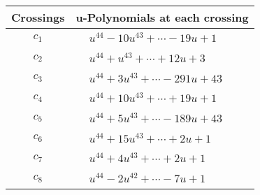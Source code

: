 \documentclass[1p]{elsarticle_modified}
\theoremstyle{definition}
\begin{document}
\begin{tabular}{m{50pt}|m{274pt}}
Crossings & \hspace{64pt}u-Polynomials at each crossing \\
\hline $$\begin{aligned}c_{1}\end{aligned}$$&$\begin{aligned}
&u^{44}-10 u^{43}+\cdots-19 u+1
\end{aligned}$\\
\hline $$\begin{aligned}c_{2}\end{aligned}$$&$\begin{aligned}
&u^{44}+u^{43}+\cdots+12 u+3
\end{aligned}$\\
\hline $$\begin{aligned}c_{3}\end{aligned}$$&$\begin{aligned}
&u^{44}+3 u^{43}+\cdots-291 u+43
\end{aligned}$\\
\hline $$\begin{aligned}c_{4}\end{aligned}$$&$\begin{aligned}
&u^{44}+10 u^{43}+\cdots+19 u+1
\end{aligned}$\\
\hline $$\begin{aligned}c_{5}\end{aligned}$$&$\begin{aligned}
&u^{44}+5 u^{43}+\cdots-189 u+43
\end{aligned}$\\
\hline $$\begin{aligned}c_{6}\end{aligned}$$&$\begin{aligned}
&u^{44}+15 u^{43}+\cdots+2 u+1
\end{aligned}$\\
\hline $$\begin{aligned}c_{7}\end{aligned}$$&$\begin{aligned}
&u^{44}+4 u^{43}+\cdots+2 u+1
\end{aligned}$\\
\hline $$\begin{aligned}c_{8}\end{aligned}$$&$\begin{aligned}
&u^{44}-2 u^{42}+\cdots-7 u+1
\end{aligned}$\\

\end{tabular}
\end{document}
